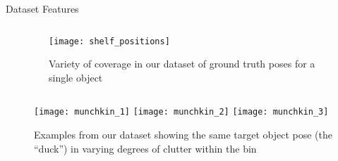 \begin{columns}[t]
\begin{column}{0.68\textwidth}
\begin{block} {\large Dataset Features}
\begin{columns}[T]
\begin{column}{0.59\textwidth}
				\end{column}
				\begin{column}{0.40\textwidth}
					\centering
					\begin{figure}[h]
						\texttt{[image: shelf\_positions]}
						\caption{Variety of coverage in our dataset of ground truth poses for a single object}
					\end{figure}
				\end{column}
			\end{columns}
			\hspace{0.02\textwidth}
			\begin{figure}[h]
				\texttt{[image: munchkin\_1]} \hspace{0.02\textwidth}
				\texttt{[image: munchkin\_2]} \hspace{0.02\textwidth}
				\texttt{[image: munchkin\_3]} 
				\caption{Examples from our dataset showing the same target object pose (the ``duck'') in varying degrees of clutter within the bin}
			\end{figure}
		\end{block}
	\end{column}
\end{columns}



